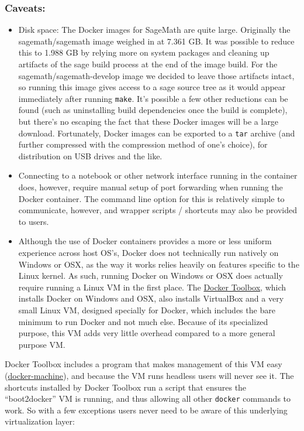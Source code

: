 \subsubsection{Caveats:}\label{caveats}

\begin{itemize}
\item
  Disk space: The Docker images for SageMath are quite large. Originally
  the sagemath/sagemath image weighed in at 7.361 GB. It was possible to
  reduce this to 1.988 GB by relying more on system packages and
  cleaning up artifacts of the sage build process at the end of the
  image build. For the sagemath/sagemath-develop image we decided to
  leave those artifacts intact, so running this image gives access to a
  sage source tree as it would appear immediately after running
  \texttt{make}. It's possible a few other reductions can be found (such
  as uninstalling build dependencies once the build is complete), but
  there's no escaping the fact that these Docker images will be a large
  download. Fortunately, Docker images can be exported to a \texttt{tar}
  archive (and further compressed with the compression method of one's
  choice), for distribution on USB drives and the like.
\item
  Connecting to a notebook or other network interface running in the
  container does, however, require manual setup of port forwarding when
  running the Docker container. The command line option for this is
  relatively simple to communicate, however, and wrapper scripts /
  shortcuts may also be provided to users.
\item
  Although the use of Docker containers provides a more or less uniform
  experience across host OS's, Docker does not technically run natively
  on Windows or OSX, as the way it works relies heavily on features
  specific to the Linux kernel. As such, running Docker on Windows or
  OSX does actually require running a Linux VM in the first place. The
  \href{https://www.docker.com/products/docker-toolbox}{Docker Toolbox},
  which installs Docker on Windows and OSX, also installs VirtualBox and
  a very small Linux VM, designed specially for Docker, which includes
  the bare minimum to run Docker and not much else. Because of its
  specialized purpose, this VM adds very little overhead compared to a
  more general purpose VM.
\end{itemize}

Docker Toolbox includes a program that makes management of this VM easy
(\href{https://docs.docker.com/machine/}{docker-machine}), and because
the VM runs headless users will never see it. The shortcuts installed by
Docker Toolbox run a script that ensures the ``boot2docker'' VM is
running, and thus allowing all other \texttt{docker} commands to work.
So with a few exceptions users never need to be aware of this underlying
virtualization layer:

